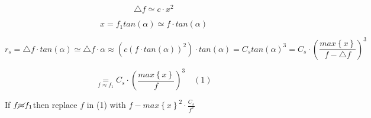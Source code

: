 \documentclass[a4paper,12pt]{article}
\begin{document}
\[
\triangle f\simeq c\cdotp x^{2}
\]

\[
x=f_{1}tan\left(\alpha\right)\simeq f\cdotp tan\left(\alpha\right)
\]

\[
r_{s}=\triangle f\cdotp tan\left(\alpha\right)\simeq\triangle f\cdotp\alpha\approx\left(c\left(f\cdotp tan\left(\alpha\right)\right)^{2}\right)\cdotp tan\left(\alpha\right)=C_{s}tan\left(\alpha\right)^{3}=C_{s}\cdotp\left(\frac{max\left\{ x\right\} }{f-\triangle f}\right)^{3}
\]

\[
\underset{f\approx f_{1}}{=}C_{s}\cdotp\left(\frac{max\left\{ x\right\} }{f}\right)^{3}\quad(1)
\]

If $f\cancel{\approx}f_{1}$then replace $f$ in (1) with $f-max\left\{ x\right\} ^{2}\cdotp\frac{C_{s}}{f^{2}}$

\printbibliography


\end{document}
